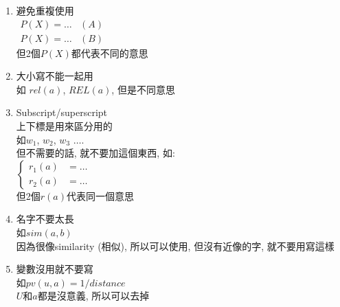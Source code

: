 \begin{enumerate}
  \item
  {
    避免重複使用\\
    $
      \begin{array}{ll}
            P(X) = \ldots & (A)\\
            P(X) = \ldots & (B)
      \end{array}
    $\\
    但2個$ P(X) $都代表不同的意思
  } %

  \item
  {
    大小寫不能一起用\\
    如 $ rel (a) $, $ REL(a) $, 但是不同意思
  } %

  \item
  {
    Subscript/superscript\\
    上下標是用來區分用的\\
    如$ w_{1} $, $ w_{2} $, $ w_{3} $ $ \ldots $.\\

    但不需要的話, 就不要加這個東西, 如:\\
    $
      \left\{
        \begin{array}{ll}
          r_{1}(a) & = \ldots\\
          r_{2}(a) & = \ldots 
      	\end{array}
      \right.
    $\\
    但2個$ r(a) $代表同一個意思
  } %

  \item
  {
    名字不要太長\\
    如$ sim(a,b) $\\
    因為很像similarity (相似), 所以可以使用, 但沒有近像的字, 就不要用寫這樣
  } %

  \item
  {
    變數沒用就不要寫\\
    如$ pv(u,a) = 1 / distance $\\
    $U$和$a$都是沒意義, 所以可以去掉
  } %
\end{enumerate}

\EndChapter
